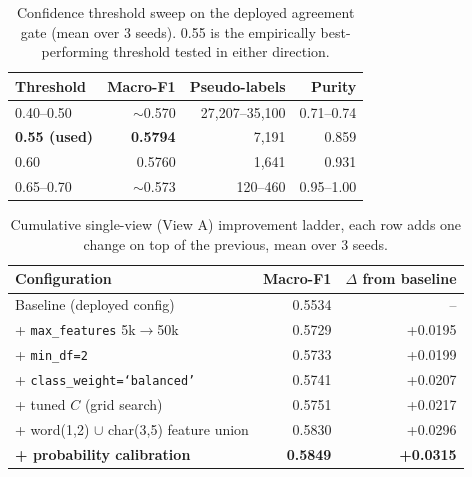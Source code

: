 \begin{table}[H]
\centering
\begin{tabular}{lrrr}
\toprule
\textbf{Threshold} & \textbf{Macro-F1} & \textbf{Pseudo-labels} & \textbf{Purity} \\
\midrule
0.40--0.50 & $\sim$0.570 & 27,207--35,100 & 0.71--0.74 \\
\textbf{0.55 (used)} & \textbf{0.5794} & 7{,}191 & 0.859 \\
0.60 & 0.5760 & 1{,}641 & 0.931 \\
0.65--0.70 & $\sim$0.573 & 120--460 & 0.95--1.00 \\
\bottomrule
\end{tabular}
\caption{Confidence threshold sweep on the deployed agreement gate (mean
over 3 seeds). 0.55 is the empirically best-performing threshold tested in
either direction.}
\label{tab:threshold-sweep}
\end{table}

\begin{table}[H]
\centering
\begin{tabular}{lrr}
\toprule
\textbf{Configuration} & \textbf{Macro-F1} & \textbf{$\Delta$ from baseline} \\
\midrule
Baseline (deployed config)                  & 0.5534 & --      \\
+ \texttt{max\_features} 5k$\to$50k         & 0.5729 & +0.0195 \\
+ \texttt{min\_df=2}                        & 0.5733 & +0.0199 \\
+ \texttt{class\_weight=`balanced'}         & 0.5741 & +0.0207 \\
+ tuned $C$ (grid search)                   & 0.5751 & +0.0217 \\
+ word(1,2) $\cup$ char(3,5) feature union  & 0.5830 & +0.0296 \\
\textbf{+ probability calibration}          & \textbf{0.5849} & \textbf{+0.0315} \\
\bottomrule
\end{tabular}
\caption{Cumulative single-view (View A) improvement ladder, each row adds
one change on top of the previous, mean over 3 seeds.}
\label{tab:improvement-ladder}
\end{table}

